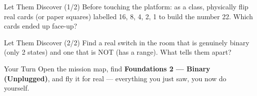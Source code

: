 \documentclass[aspectratio=169]{beamer}
\begin{document}
\begin{frame}{Let Them Discover (1/2)}
    \large
    Before touching the platform: as a class, physically flip real cards (or paper squares) labelled 16, 8, 4, 2, 1 to build the number 22. Which cards ended up face-up?
\end{frame}


\begin{frame}{Let Them Discover (2/2)}
    \large
    Find a real switch in the room that is genuinely binary (only 2 states) and one that is NOT (has a range). What tells them apart?
\end{frame}

\begin{frame}{Your Turn}
    \Large
    Open the mission map, find \textbf{Foundations 2 — Binary (Unplugged)}, and fly it for real ---
    everything you just saw, you now do yourself.
\end{frame}
\end{document}
